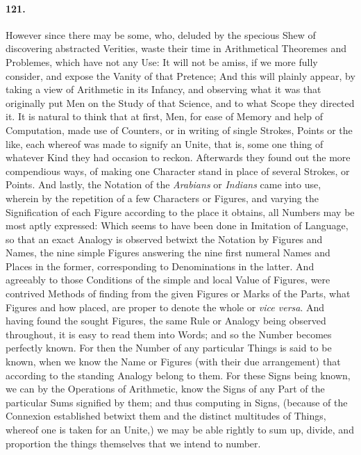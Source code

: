 \documentclass[]{article}
\newenvironment{sectionbody}{\begin{multicols}{2}}{\end{multicols}}
\begin{document}
\begin{sectionbody}
\paragraph{121.} However since there may be some, who, deluded by the specious
Shew of discovering abstracted Verities, waste their time in
Arithmetical Theoremes and Problemes, which have not any Use: It
will not be amiss, if we more fully consider, and expose the
Vanity of that Pretence; And this will plainly appear, by taking
a view of Arithmetic in its Infancy, and observing what it was
that originally put Men on the Study of that Science, and to what
Scope they directed it.  It is natural to think that at first,
Men, for ease of Memory and help of Computation, made use of
Counters, or in writing of single Strokes, Points or the like,
each whereof was made to signify an Unite, that is, some one
thing of whatever Kind they had occasion to reckon.  Afterwards
they found out the more compendious ways, of making one Character
stand in place of several Strokes, or Points.  And lastly, the
Notation of the \emph{Arabians} or \emph{Indians} came into
use, wherein by the repetition of a few Characters or Figures,
and varying the Signification of each Figure according to the
place it obtains, all Numbers may be most aptly expressed: Which
seems to have been done in Imitation of Language, so that an
exact Analogy is observed betwixt the Notation by Figures and
Names, the nine simple Figures answering the nine first numeral
Names and Places in the former, corresponding to Denominations in
the latter.  And agreeably to those Conditions of the simple and
local Value of Figures, were contrived Methods of finding from
the given Figures or Marks of the Parts, what Figures and how
placed, are proper to denote the whole or \emph{vice versa}.
And having found the sought Figures, the same Rule or Analogy
being observed throughout, it is easy to read them into Words;
and so the Number becomes perfectly known.  For then the Number
of any particular Things is said to be known, when we know the
Name or Figures (with their due arrangement) that according to
the standing Analogy belong to them.  For these Signs being
known, we can by the Operations of Arithmetic, know the Signs of
any Part of the particular Sums signified by them; and thus
computing in Signs, (because of the Connexion established betwixt
them and the distinct multitudes of Things, whereof one is taken
for an Unite,) we may be able rightly to sum up, divide, and
proportion the things themselves that we intend to number.




\end{sectionbody}
\end{document}
